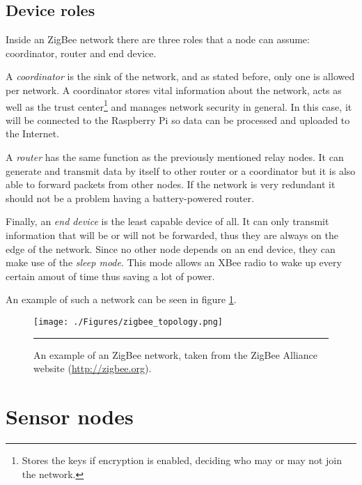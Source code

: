 \subsection{Device roles}

Inside an ZigBee network there are three roles that a node can assume: coordinator, router and end device.

A \emph{coordinator} is the sink of the network, and as stated before, only one is allowed per network. A coordinator stores vital information about the network, acts as well as the trust center\footnote{Stores the keys if encryption is enabled, deciding who may or may not join the network.} and manages network security in general\citep{sensornetworktc}. In this case, it will be connected to the Raspberry Pi so data can be processed and uploaded to the Internet.

A \emph{router} has the same function as the previously mentioned relay nodes. It can generate and transmit data by itself to other router or a coordinator but it is also able to forward packets from other nodes. If the network is very redundant it should not be a problem having a battery-powered router.

Finally, an \emph{end device} is the least capable device of all. It can only transmit information that will be or will not be forwarded, thus they are always on the edge of the network. Since no other node depends on an end device, they can make use of the \emph{sleep mode}. This mode allows an XBee radio to wake up every certain amout of time thus saving a lot of power.

An example of such a network can be seen in figure \ref{fig:ZBeeNet}.

\begin{figure}[htbp]
    \centering
        \texttt{[image: ./Figures/zigbee\_topology.png]}
        \rule{35em}{0.5pt}
        \caption[ZigBee network example]{An example of an ZigBee network, taken from the ZigBee Alliance website (\url{http://zigbee.org}).}
    \label{fig:ZBeeNet}
\end{figure}


\section{Sensor nodes}

